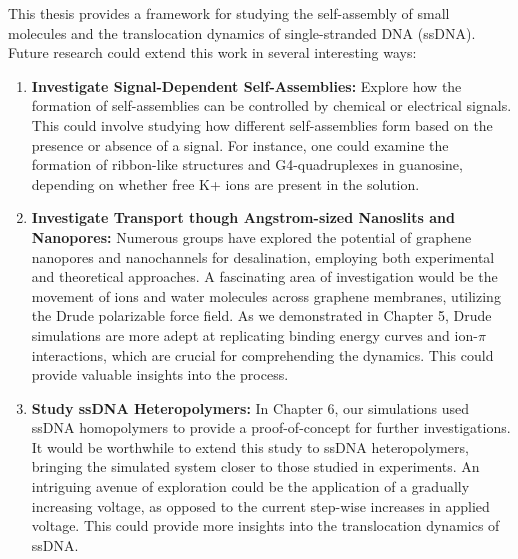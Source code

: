 This thesis provides a framework for studying the self-assembly of small molecules and the translocation dynamics of single-stranded DNA (ssDNA). Future research could extend this work in several interesting ways:
\begin{enumerate}
    \item \textbf{Investigate Signal-Dependent Self-Assemblies:} Explore how the formation of self-assemblies can be controlled by chemical or electrical signals. This could involve studying how different self-assemblies form based on the presence or absence of a signal. For instance, one could examine the formation of ribbon-like structures and G4-quadruplexes in guanosine, depending on whether free K+ ions are present in the solution. 

    \item \textbf{Investigate Transport though Angstrom-sized Nanoslits and Nanopores:} Numerous groups have explored the potential of graphene nanopores and nanochannels for desalination, employing both experimental and theoretical approaches. A fascinating area of investigation would be the movement of ions and water molecules across graphene membranes, utilizing the Drude polarizable force field. As we demonstrated in Chapter 5, Drude simulations are more adept at replicating binding energy curves and ion-$\pi$ interactions, which are crucial for comprehending the dynamics. This could provide valuable insights into the process.

    \item \textbf{Study ssDNA Heteropolymers:} In Chapter 6, our simulations used ssDNA homopolymers to provide a proof-of-concept for further investigations. It would be worthwhile to extend this study to ssDNA heteropolymers, bringing the simulated system closer to those studied in experiments. An intriguing avenue of exploration could be the application of a gradually increasing voltage, as opposed to the current step-wise increases in applied voltage. This could provide more insights into the translocation dynamics of ssDNA.
\end{enumerate}
